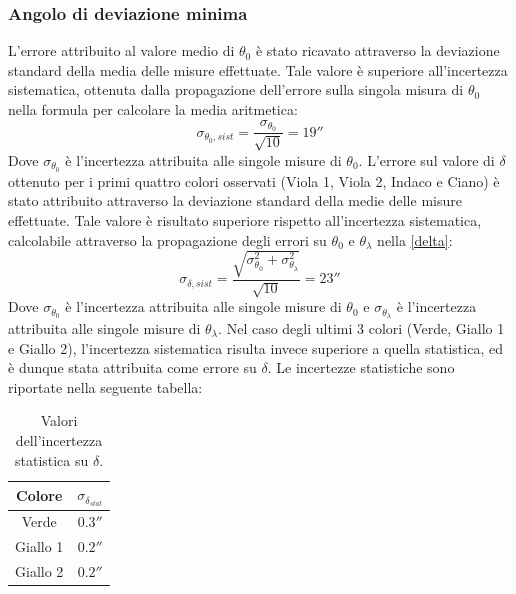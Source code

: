 \documentclass[]{article}
\begin{document}
    \subsubsection{Angolo di deviazione minima}
    L'errore attribuito al valore medio di $\theta_0$ è stato ricavato attraverso la deviazione standard della media delle misure effettuate. Tale valore è superiore all'incertezza sistematica, ottenuta dalla propagazione dell'errore sulla singola misura di $\theta_0$ nella formula per calcolare la media aritmetica:
    \begin{equation}
        \label{theta0-err-sist}
        \sigma_{\theta_0,sist} = \frac{\sigma_{\theta_0}}{\sqrt{10}} = 19''
    \end{equation}
    Dove $\sigma_{\theta_0}$ è l'incertezza attribuita alle singole misure di $\theta_0$.
    L'errore sul valore di $\delta$ ottenuto per i primi quattro colori osservati (Viola 1, Viola 2, Indaco e Ciano) è stato attribuito attraverso la deviazione standard della medie delle misure effettuate. Tale valore è risultato superiore rispetto all'incertezza sistematica, calcolabile attraverso la propagazione degli errori su $\theta_0$ e $\theta_{\lambda}$ nella \ref{delta}:
    \begin{equation}
        \label{delta-err-sist}
        \sigma_{\delta, sist}= \frac{\sqrt{ \sigma_{\theta_0}^2 + \sigma_{\theta_{\lambda}}^2 }}{\sqrt{10}} = 23''
    \end{equation}
    Dove $\sigma_{\theta_0}$ è l'incertezza attribuita alle singole misure di $\theta_0$ e $\sigma_{\theta_{\lambda}}$ è l'incertezza attribuita alle singole misure di $\theta_{\lambda}$.
    Nel caso degli ultimi 3 colori (Verde, Giallo 1 e Giallo 2), l'incertezza sistematica risulta invece superiore a quella statistica, ed è dunque stata attribuita come errore su $\delta$. Le incertezze statistiche sono riportate nella seguente tabella:
    \begin{table} [H]
        \centering
        \begin{tabular}{||c|c||}
            \hline
            Colore & $\sigma_{\delta_{stat}}$\\
            \hline \hline
            Verde    & $ 0.3'' $ \\\hline
            Giallo 1 & $ 0.2'' $ \\\hline
            Giallo 2 & $ 0.2'' $ \\\hline
        \end{tabular}
        \caption{Valori dell'incertezza statistica su $\delta$.}
        \label{d-err-stat}
    \end{table}
    \label{par:dev_min_err}
\end{document}
